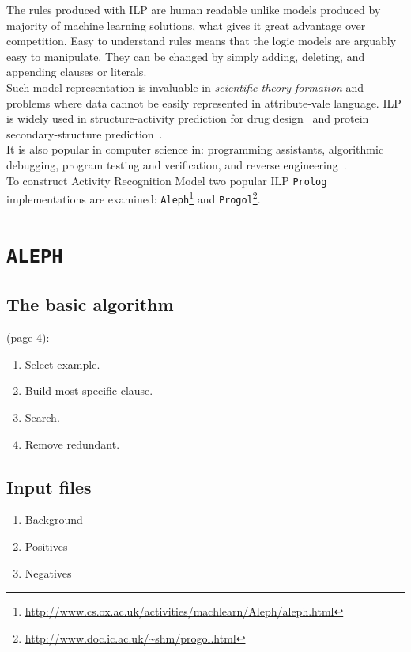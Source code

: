 \documentclass[12pt, a4paper, pdflatex, leqno, twoside, openright]{report}
\begin{document}
The rules produced with ILP are human readable unlike models produced by majority of machine learning solutions, what gives it great advantage over competition. Easy to understand rules means that the logic models are arguably easy to manipulate. They can be changed by simply adding, deleting, and appending clauses or literals.\\

Such model representation is invaluable in \emph{scientific theory formation} and problems where data cannot be easily represented in attribute-vale language. ILP is widely used in structure-activity prediction for drug design~\citep{king1992drug,michael1992modelling} and protein secondary-structure prediction~\citep{muggleton1992protein}.\\
It is also popular in computer science in: programming assistants, algorithmic debugging, program testing and verification, and reverse engineering~\citep{shapiro1983algorithmic,bergadno1993inductive,bratko1993inductive}.\\

To construct Activity Recognition Model two popular ILP \texttt{Prolog} implementations are examined: \texttt{Aleph}\footnote{\url{http://www.cs.ox.ac.uk/activities/machlearn/Aleph/aleph.html}} and \texttt{Progol}\footnote{\url{http://www.doc.ic.ac.uk/~shm/progol.html}}.

  \section{\texttt{ALEPH}}
    \subsection{The basic algorithm}
(page 4):
\begin{enumerate}
  \item Select example.
  \item Build most-specific-clause.
  \item Search.
  \item Remove redundant.
\end{enumerate}

    \subsection{Input files}
\begin{enumerate}
  \item Background
  \item Positives
  \item Negatives
\end{enumerate}
\end{document}
